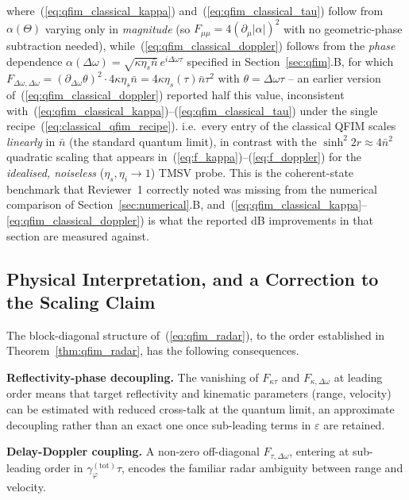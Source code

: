 \documentclass[journal]{IEEEtran}
\begin{document}
where~(\ref{eq:qfim_classical_kappa}) and~(\ref{eq:qfim_classical_tau}) follow from $\alpha(\Theta)$ varying only in \emph{magnitude} (so $F_{\mu\mu}=4(\partial_\mu|\alpha|)^2$ with no geometric-phase subtraction needed), while~(\ref{eq:qfim_classical_doppler}) follows from the \emph{phase} dependence $\alpha(\Delta\omega)=\sqrt{\kappa\eta_s\bar n}\,e^{i\Delta\omega\tau}$ specified in Section~\ref{sec:qfim}.B, for which $F_{\Delta\omega,\Delta\omega}=(\partial_{\Delta\omega}\theta)^2\cdot4\kappa\eta_s\bar n=4\kappa\eta_s(\tau)\bar n\tau^2$ with $\theta=\Delta\omega\tau$ -- an earlier version of~(\ref{eq:qfim_classical_doppler}) reported half this value, inconsistent with~(\ref{eq:qfim_classical_kappa})--(\ref{eq:qfim_classical_tau}) under the single recipe~(\ref{eq:classical_qfim_recipe}). i.e.\ every entry of the classical QFIM scales \emph{linearly} in $\bar n$ (the standard quantum limit), in contrast with the $\sinh^2 2r\approx 4\bar n^2$ quadratic scaling that appears in~(\ref{eq:f_kappa})--(\ref{eq:f_doppler}) for the \emph{idealised, noiseless} ($\eta_s,\eta_i\to1$) TMSV probe. This is the coherent-state benchmark that Reviewer~1 correctly noted was missing from the numerical comparison of Section~\ref{sec:numerical}.B, and~(\ref{eq:qfim_classical_kappa}--\ref{eq:qfim_classical_doppler}) is what the reported dB improvements in that section are measured against.

\subsection{Physical Interpretation, and a Correction to the Scaling Claim}

The block-diagonal structure of~(\ref{eq:qfim_radar}), to the order established in Theorem~\ref{thm:qfim_radar}, has the following consequences.

\textbf{Reflectivity-phase decoupling.} The vanishing of $F_{\kappa\tau}$ and $F_{\kappa,\Delta\omega}$ at leading order means that target reflectivity and kinematic parameters (range, velocity) can be estimated with reduced cross-talk at the quantum limit, an approximate decoupling rather than an exact one once sub-leading terms in $\varepsilon$ are retained.

\textbf{Delay-Doppler coupling.} A non-zero off-diagonal $F_{\tau,\Delta\omega}$, entering at sub-leading order in $\gamma_\varphi^{(\text{tot})}\tau$, encodes the familiar radar ambiguity between range and velocity.
\end{document}
